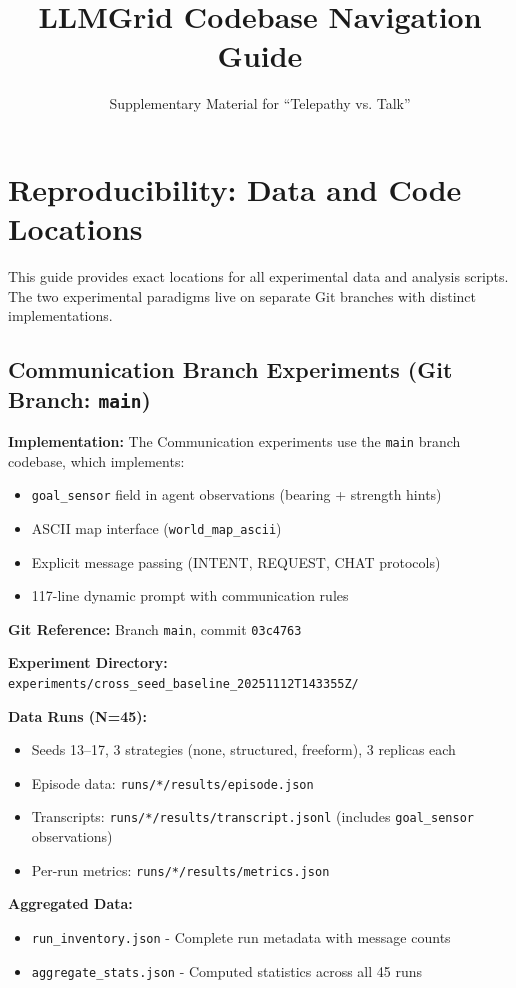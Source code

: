 \documentclass[11pt]{article}
\title{LLMGrid Codebase Navigation Guide}
\author{Supplementary Material for ``Telepathy vs. Talk''}
\date{}
\begin{document}
\maketitle

\section{Reproducibility: Data and Code Locations}

This guide provides exact locations for all experimental data and analysis scripts. The two experimental paradigms live on separate Git branches with distinct implementations.

\subsection{Communication Branch Experiments (Git Branch: \texttt{main})}

\textbf{Implementation:} The Communication experiments use the \texttt{main} branch codebase, which implements:
\begin{itemize}
    \item \texttt{goal\_sensor} field in agent observations (bearing + strength hints)
    \item ASCII map interface (\texttt{world\_map\_ascii})
    \item Explicit message passing (INTENT, REQUEST, CHAT protocols)
    \item 117-line dynamic prompt with communication rules
\end{itemize}

\textbf{Git Reference:} Branch \texttt{main}, commit \texttt{03c4763}

\textbf{Experiment Directory:} \texttt{experiments/cross\_seed\_baseline\_20251112T143355Z/}

\textbf{Data Runs (N=45):}
\begin{itemize}
    \item Seeds 13--17, 3 strategies (none, structured, freeform), 3 replicas each
    \item Episode data: \texttt{runs/*/results/episode.json}
    \item Transcripts: \texttt{runs/*/results/transcript.jsonl} (includes \texttt{goal\_sensor} observations)
    \item Per-run metrics: \texttt{runs/*/results/metrics.json}
\end{itemize}

\textbf{Aggregated Data:}
\begin{itemize}
    \item \texttt{run\_inventory.json} - Complete run metadata with message counts
    \item \texttt{aggregate\_stats.json} - Computed statistics across all 45 runs
\end{itemize}
\end{document}
